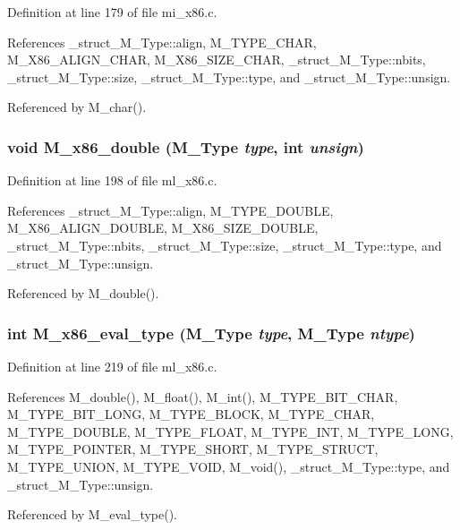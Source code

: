 Definition at line 179 of file mi\_\-x86.c.

References \_\-struct\_\-M\_\-Type::align, M\_\-TYPE\_\-CHAR, M\_\-X86\_\-ALIGN\_\-CHAR, M\_\-X86\_\-SIZE\_\-CHAR, \_\-struct\_\-M\_\-Type::nbits, \_\-struct\_\-M\_\-Type::size, \_\-struct\_\-M\_\-Type::type, and \_\-struct\_\-M\_\-Type::unsign.

Referenced by M\_\-char().
\subsubsection{\setlength{\rightskip}{0pt plus 5cm}void M\_\-x86\_\-double (\bf{M\_\-Type} {\em type}, int {\em unsign})}\label{m__x86_8h_44f6300a10cafc1f87c680770660ea27}




Definition at line 198 of file ml\_\-x86.c.

References \_\-struct\_\-M\_\-Type::align, M\_\-TYPE\_\-DOUBLE, M\_\-X86\_\-ALIGN\_\-DOUBLE, M\_\-X86\_\-SIZE\_\-DOUBLE, \_\-struct\_\-M\_\-Type::nbits, \_\-struct\_\-M\_\-Type::size, \_\-struct\_\-M\_\-Type::type, and \_\-struct\_\-M\_\-Type::unsign.

Referenced by M\_\-double().
\subsubsection{\setlength{\rightskip}{0pt plus 5cm}int M\_\-x86\_\-eval\_\-type (\bf{M\_\-Type} {\em type}, \bf{M\_\-Type} {\em ntype})}\label{m__x86_8h_96ea005a9ce63a2a4373bd068b06ebfb}




Definition at line 219 of file ml\_\-x86.c.

References M\_\-double(), M\_\-float(), M\_\-int(), M\_\-TYPE\_\-BIT\_\-CHAR, M\_\-TYPE\_\-BIT\_\-LONG, M\_\-TYPE\_\-BLOCK, M\_\-TYPE\_\-CHAR, M\_\-TYPE\_\-DOUBLE, M\_\-TYPE\_\-FLOAT, M\_\-TYPE\_\-INT, M\_\-TYPE\_\-LONG, M\_\-TYPE\_\-POINTER, M\_\-TYPE\_\-SHORT, M\_\-TYPE\_\-STRUCT, M\_\-TYPE\_\-UNION, M\_\-TYPE\_\-VOID, M\_\-void(), \_\-struct\_\-M\_\-Type::type, and \_\-struct\_\-M\_\-Type::unsign.

Referenced by M\_\-eval\_\-type().
